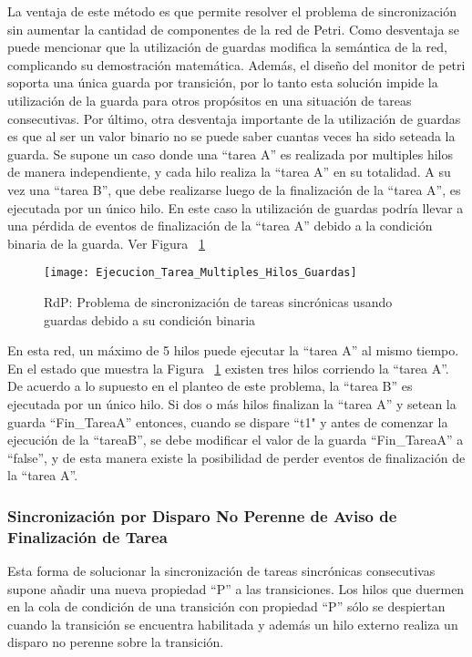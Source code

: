 La ventaja de este método es que permite resolver el problema de sincronización
sin aumentar la cantidad de componentes de la red de Petri.
Como desventaja se puede mencionar que la utilización de guardas modifica la
semántica de la red, complicando su demostración matemática. Además, el diseño del monitor de
petri soporta una única guarda por transición, por lo tanto esta solución impide
la utilización de la guarda para otros propósitos en una situación de tareas
consecutivas. Por último, otra desventaja importante de la utilización de
guardas es que al ser un valor binario no se puede saber cuantas veces ha sido seteada
la guarda.
Se supone un caso donde una ``tarea A'' es realizada por multiples hilos de manera
independiente, y cada hilo realiza la ``tarea A'' en su totalidad. A su
vez una ``tarea B'', que debe realizarse luego de la finalización de la ``tarea
A'', es ejecutada por un único hilo. En este caso la utilización de guardas
podría llevar a una pérdida de eventos de finalización de la ``tarea A'' debido
a la condición binaria de la guarda. Ver Figura ~\ref{fig:ejecucion_multiples_hilos_guardas}

\begin{figure}[H]
    \centering
    \texttt{[image: Ejecucion\_Tarea\_Multiples\_Hilos\_Guardas]}
    \caption{RdP: Problema de sincronización de tareas sincrónicas usando
    guardas debido a su condición binaria}
    \label{fig:ejecucion_multiples_hilos_guardas}
\end{figure}

En esta red, un máximo de 5 hilos puede ejecutar la ``tarea A'' al mismo
tiempo. En el estado que  muestra la Figura
~\ref{fig:ejecucion_multiples_hilos_guardas} existen tres hilos corriendo la
``tarea A''. De acuerdo a lo supuesto en el planteo de este problema, la ``tarea
B'' es ejecutada por un único hilo. Si dos o más hilos finalizan la ``tarea A''
y setean la guarda ``Fin\_TareaA'' entonces, cuando se dispare ``t1" y antes de
comenzar la ejecución de la ``tareaB'', se debe modificar el valor de la guarda
``Fin\_TareaA'' a ``false'', y de esta manera existe la posibilidad de perder
eventos de finalización de la ``tarea A''.

\subsubsection{Sincronización por Disparo No Perenne de Aviso de
Finalización de Tarea}
Esta forma de solucionar la sincronización de tareas sincrónicas consecutivas
supone añadir una nueva propiedad ``P'' a las transiciones. Los hilos que
duermen en la cola de condición de una transición con propiedad ``P'' sólo
se despiertan cuando la transición se encuentra habilitada y además un hilo
externo realiza un disparo no perenne sobre la transición.


